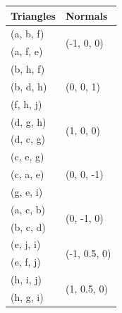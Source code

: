 \documentclass[10pt]{report}
\begin{document}
\begin{table}
    \begin{tabular}{|l|l|} 
    \hline
    \textbf{ Triangles } & \textbf{Normals }              \\ 
    \hline
    (a, b, f)            & \multirow{2}{*}{(-1, 0, 0)}    \\
    (a, f, e)            &                                \\ 
    \hline
    (b, h, f)            & \multirow{3}{*}{(0, 0, 1)}     \\
    (b, d, h)            &                                \\
    (f, h, j)            &                                \\ 
    \hline
    (d, g, h)            & \multirow{2}{*}{(1, 0, 0)}     \\
    (d, c, g)            &                                \\ 
    \hline
    (c, e, g)            & \multirow{3}{*}{(0, 0, -1)}    \\
    (c, a, e)            &                                \\
    (g, e, i)            &                                \\ 
    \hline
    (a, c, b)            & \multirow{2}{*}{(0, -1, 0)}    \\
    (b, c, d)            &                                \\ 
    \hline
    (e, j, i)            & \multirow{2}{*}{(-1, 0.5, 0)}  \\
    (e, f, j)            &                                \\ 
    \hline
    (h, i, j)            & \multirow{2}{*}{(1, 0.5, 0)}   \\
    (h, g, i)            &                                \\
    \hline
    \end{tabular}
\end{table}
\end{document}
